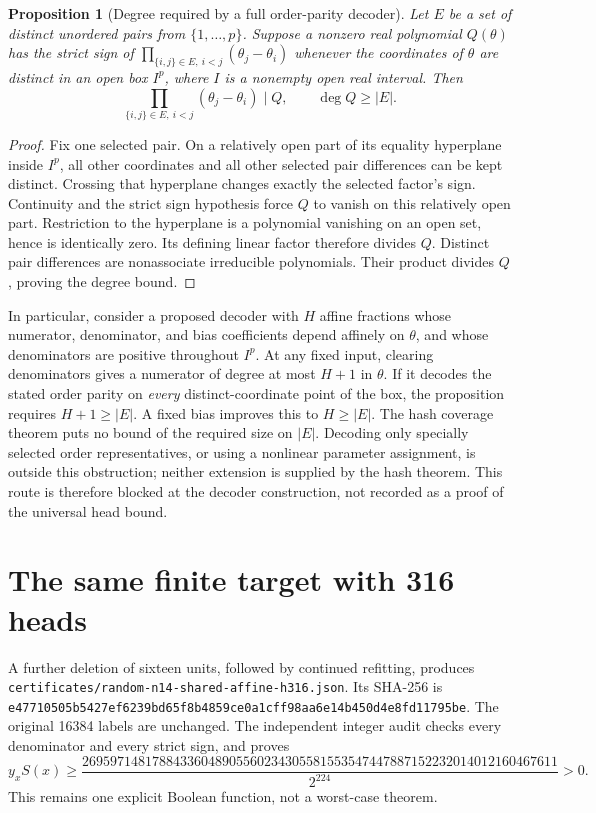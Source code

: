 \documentclass[11pt]{article}
\newtheorem{proposition}{Proposition}
\begin{document}
\begin{proposition}[Degree required by a full order-parity decoder]
Let $E$ be a set of distinct unordered pairs from $\{1,\ldots,p\}$.
Suppose a nonzero real polynomial $Q(\theta)$ has the strict sign of
$\prod_{\{i,j\}\in E,\ i<j}(\theta_j-\theta_i)$ whenever the
coordinates of $\theta$ are distinct in an open box $I^p$, where
$I$ is a nonempty open real interval. Then
\[
 \prod_{\{i,j\}\in E,\ i<j}(\theta_j-\theta_i)\mid Q,
 \qquad \deg Q\ge |E|.
\]
\end{proposition}
\begin{proof}
Fix one selected pair. On a relatively open part of its equality
hyperplane inside $I^p$, all other coordinates and all other selected
pair differences can be kept distinct. Crossing that hyperplane changes
exactly the selected factor's sign. Continuity and the strict sign
hypothesis force $Q$ to vanish on this relatively open part. Restriction
to the hyperplane is a polynomial vanishing on an open set, hence is
identically zero. Its defining linear factor therefore divides $Q$.
Distinct pair differences are nonassociate irreducible polynomials.
Their product divides $Q$, proving the degree bound.
\end{proof}

In particular, consider a proposed decoder with $H$ affine fractions
whose numerator, denominator, and bias coefficients depend affinely on
$\theta$, and whose denominators are positive throughout $I^p$.
At any fixed input, clearing denominators gives a numerator of degree
at most $H+1$ in $\theta$. If it decodes the stated order parity on
\emph{every} distinct-coordinate point of the box, the proposition
requires $H+1\ge |E|$. A fixed bias improves this to $H\ge |E|$.
The hash coverage theorem puts no bound of the required size on
$|E|$. Decoding only specially selected order representatives, or using
a nonlinear parameter assignment, is outside this obstruction; neither
extension is supplied by the hash theorem. This route is therefore
blocked at the decoder construction, not recorded as a proof of the
universal head bound.


\section{The same finite target with 316 heads}

A further deletion of sixteen units, followed by continued refitting,
produces \texttt{certificates/random-n14-shared-affine-h316.json}.
Its SHA-256 is
\texttt{e47710505b5427ef6239bd65f8b4859ce0a1cff98aa6e14b450d4e8fd11795be}.
The original 16384 labels are unchanged. The independent integer audit
checks every denominator and every strict sign, and proves
\[
 y_xS(x)\ge \frac{26959714817884336048905560234305581553547447887152232014012160467611}{2^{224}}>0.
\]
This remains one explicit Boolean function, not a worst-case theorem.
\end{document}
